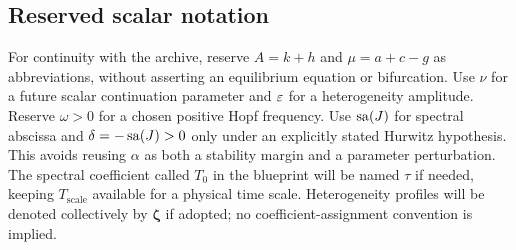 \subsection{Reserved scalar notation}
For continuity with the archive, reserve $A=k+h$ and $\mu=a+c-g$ as
abbreviations, without asserting an equilibrium equation or bifurcation.
Use $\nu$ for a future scalar continuation parameter and $\varepsilon$ for a
heterogeneity amplitude. Reserve $\omega>0$ for a chosen positive Hopf
frequency. Use $\operatorname{sa}(J)$ for spectral abscissa and $\delta=-\operatorname{sa}(J)>0$ only
under an explicitly stated Hurwitz hypothesis. This avoids reusing
$\alpha$ as both a stability margin and a parameter perturbation.
The spectral coefficient called $T_0$ in the blueprint will be named
$\tau$ if needed, keeping $T_{\mathrm{scale}}$ available for a physical
time scale. Heterogeneity profiles will be denoted collectively by
$\boldsymbol\zeta$ if adopted; no coefficient-assignment convention is implied.
